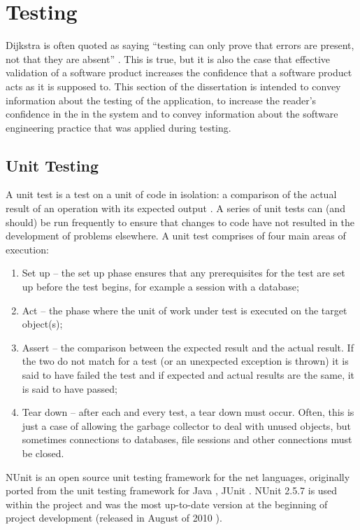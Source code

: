 \chapter{Testing}
\label{testing}
Dijkstra is often quoted as saying ``testing can only prove that errors are present, not that they are absent'' \cite{dijkstra}. This is true, but it is also the case that effective validation of a software product increases the confidence that a software product acts as it is supposed to.  This section of the dissertation is intended to convey information about the testing of the application, to increase the reader's confidence in the in the system and to convey information about the software engineering practice that was applied during testing.

\section{Unit Testing}
A unit test is a test on a unit of code in isolation: a comparison of the actual result of an operation with its expected output \cite{unitTesting}.  A series of unit tests can (and should) be run frequently to ensure that changes to code have not resulted in the development of problems elsewhere.  A unit test comprises of four main areas of execution:
\begin{enumerate}
	\item Set up -- the set up phase ensures that any prerequisites for the test are set up before the test begins, for example a session with a database;
	\item Act -- the phase where the unit of work under test is executed on the target object(s);
	\item Assert -- the comparison between the expected result and the actual result.  If the two do not match for a test (or an unexpected exception is thrown) it is said to have failed the test and if expected and actual results are the same, it is said to have passed;
	\item Tear down -- after each and every test, a tear down must occur.  Often, this is just a case of allowing the garbage collector to deal with unused objects, but sometimes connections to databases, file sessions and other connections must be closed.
\end{enumerate}

NUnit is an open source unit testing framework for the \gls{net} languages, originally ported from the unit testing framework for Java \cite{jUnitHome}, JUnit \cite{nUnitHome}.  NUnit 2.5.7 is used within the project and was the most up-to-date version at the beginning of project development (released in August of 2010 \cite{nUnitRelease}).  

